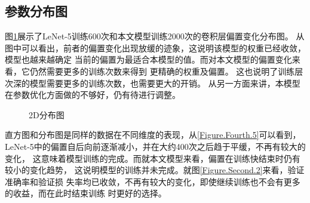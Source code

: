   \subsection{\hei\xiaosan\textbf{参数分布图}}
    图\ref{Figure.Fourth.4}展示了LeNet-5训练600次和本文模型训练2000次的卷积层偏置变化分布图。
    从图中可以看出，前者的偏置变化出现放缓的迹象，这说明该模型的权重已经收敛，模型也越来越确定
    当前的偏置为最适合本模型的值。而对本文模型的偏置变化来看，它仍然需要更多的训练次数来得到
    更精确的权重及偏置。
    这也说明了训练层次深的模型需要更多的训练次数，也需要更大的开销。
    从另一方面来讲，本模型在参数优化方面做的不够好，仍有待进行调整。

    \begin{figure}[H]
      \centering
      \caption{2D分布图}
      \label{Figure.Fourth.4}
    \end{figure}
    
    直方图和分布图是同样的数据在不同维度的表现，从\ref{Figure.Fourth.5}可以看到，
    LeNet-5中的偏置自后向前逐渐减小，并在大约400次之后趋于平缓，不再有较大的变化，
    这意味着模型训练的完成。而就本文模型来看，偏置在训练快结束时仍有较小的变化趋势，
    这说明模型的训练并未完成。就图\ref{Figure.Second.2}来看，验证准确率和验证损
    失率均已收敛，不再有较大的变化，即使继续训练也不会有更多的收益，而在此时结束训练
    时更好的选择。

